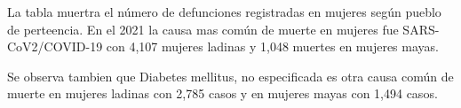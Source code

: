 La tabla muertra el número de defunciones registradas en mujeres según pueblo de perteencia. En el 2021 la causa mas común de muerte en mujeres fue SARS-CoV2/COVID-19 con 4,107 mujeres ladinas y 1,048 muertes en mujeres mayas. 

Se observa tambien que Diabetes mellitus, no especificada es otra causa común de muerte en mujeres ladinas con 2,785 casos y en mujeres mayas con 1,494 casos. 